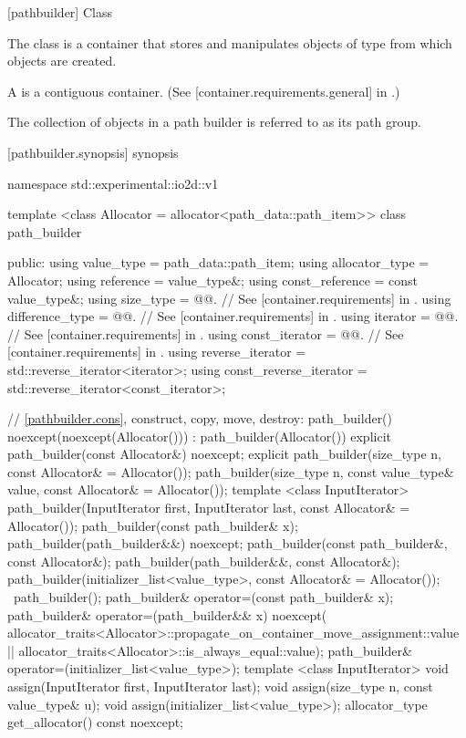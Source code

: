  [pathbuilder] {Class }%

\pnum
{}%
The class  is a container that stores and manipulates objects of type  from which  objects are created.

\pnum
A  is a contiguous container. (See [container.requirements.general] in \cppseventeen.)

\pnum
The collection of  objects in a path builder is referred to as its path group.

 [pathbuilder.synopsis] { synopsis}%

\begin{codeblock}
namespace std::experimental::io2d::v1 {
  template <class Allocator = allocator<path_data::path_item>>
  class path_builder {
  public:
    using value_type = path_data::path_item;
    using allocator_type = Allocator;
    using reference = value_type&;
    using const_reference = const value_type&;
    using size_type       = @@. // See [container.requirements] in \cppseventeen.
    using difference_type = @@. // See [container.requirements] in \cppseventeen.
    using iterator       = @@. // See [container.requirements] in \cppseventeen.
    using const_iterator = @@. // See [container.requirements] in \cppseventeen.
    using reverse_iterator       = std::reverse_iterator<iterator>;
    using const_reverse_iterator = std::reverse_iterator<const_iterator>;
    
    // \ref{pathbuilder.cons}, construct, copy, move, destroy:
    path_builder() noexcept(noexcept(Allocator())) :
      path_builder(Allocator()) { }
    explicit path_builder(const Allocator&) noexcept;
    explicit path_builder(size_type n, const Allocator& = Allocator());
    path_builder(size_type n, const value_type& value,
      const Allocator& = Allocator());
    template <class InputIterator>
    path_builder(InputIterator first, InputIterator last,
      const Allocator& = Allocator());
    path_builder(const path_builder& x);
    path_builder(path_builder&&) noexcept;
    path_builder(const path_builder&, const Allocator&);
    path_builder(path_builder&&, const Allocator&);
    path_builder(initializer_list<value_type>, const Allocator& = Allocator());
    ~path_builder();
    path_builder& operator=(const path_builder& x);
    path_builder& operator=(path_builder&& x)
      noexcept(
      allocator_traits<Allocator>::propagate_on_container_move_assignment::value
      ||
      allocator_traits<Allocator>::is_always_equal::value);
    path_builder& operator=(initializer_list<value_type>);
    template <class InputIterator>
    void assign(InputIterator first, InputIterator last);
    void assign(size_type n, const value_type& u);
    void assign(initializer_list<value_type>);
    allocator_type get_allocator() const noexcept;
    
}}
\end{codeblock}
